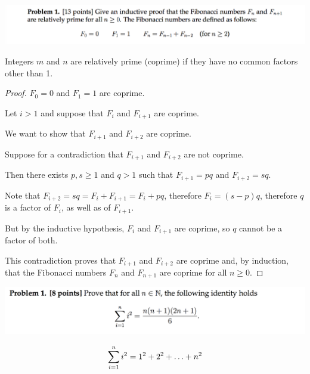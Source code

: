 \documentclass[12pt]{article}
\begin{document}
\begin{mdframed}
\includegraphics[width=400pt]{img/MIT-math-for-cs-2004-1.png}
\end{mdframed}

\begin{definition*}
  Integers $m$ and $n$ are relatively prime (coprime) if they have no common factors other than 1.
\end{definition*}


\begin{proof}
  $F_0 = 0$ and $F_1 = 1$ are coprime.

  Let $i > 1$ and suppose that $F_{i}$ and $F_{i+1}$ are coprime.

  We want to show that $F_{i+1}$ and $F_{i+2}$ are coprime.

  Suppose for a contradiction that $F_{i+1}$ and $F_{i+2}$ are not coprime.

  Then there exists $p, s \geq 1$ and $q > 1$ such that $F_{i+1} = pq$ and $F_{i+2} = sq$.

  Note that $F_{i+2} = sq = F_{i} + F_{i+1} = F_i + pq$, therefore $F_i = (s - p)q$, therefore
  $q$ is a factor of $F_i$, as well as of $F_{i+1}$.

  But by the inductive hypothesis, $F_{i}$ and $F_{i+1}$ are coprime, so $q$ cannot be a factor of
  both.

  This contradiction proves that $F_{i+1}$ and $F_{i+2}$ are coprime and, by induction, that the
  Fibonacci numbers $F_n$ and $F_{n+1}$ are coprime for all $n \geq 0$.


\end{proof}




\newpage
\begin{mdframed}
\includegraphics[width=400pt]{img/MIT-math-for-cs-2006-1.png}
\end{mdframed}
\begin{align*}
  \sum_{i=1}^{n} i^2 = 1^2 + 2^2 + \ldots + n^2
\end{align*}
\end{document}
